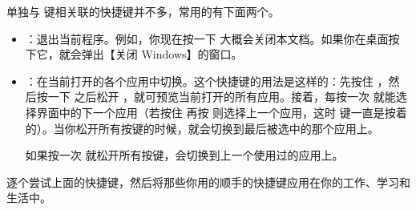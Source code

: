 单独与  键相关联的快捷键并不多，常用的有下面两个。

\begin{itemize}
  \item {}：退出当前程序。例如，你现在按一下  大概会关闭本文档。如果你在桌面按下它，就会弹出【关闭 Windows】的窗口。
  \item {}：在当前打开的各个应用中切换。这个快捷键的用法是这样的：先按住 ，然后按一下  之后松开 ，就可预览当前打开的所有应用。接着，每按一次  就能选择界面中的下一个应用（若按住  再按  则选择上一个应用，这时  键一直是按着的）。当你松开所有按键的时候，就会切换到最后被选中的那个应用上。

  如果按一次  就松开所有按键，会切换到上一个使用过的应用上。

\end{itemize}

\practice

逐个尝试上面的快捷键，然后将那些你用的顺手的快捷键应用在你的工作、学习和生活中。
